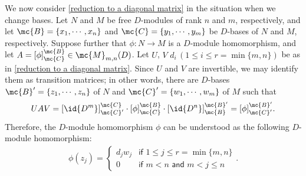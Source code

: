 \begin{obs}\label{over ED: change of bases}
    We now consider \cref{reduction to a diagonal matrix} in the situation when we change bases.
    Let $N$ and $M$ be free $D$-modules of rank $n$ and $m$, respectively, and let $\mc{B}=\{x_1, \cdots, x_n\}$ and $\mc{C}=\{y_1, \cdots, y_m\}$ be $D$-bases of $N$ and $M$, respectively.
    Suppose further that $\phi: N\rightarrow M$ is a $D$-module homomorphism, and let $A=[\phi]^\mc{B}_\mc{C}\in\mc{M}_{m, n}(D)$.
    Let $U$, $V$ $d_i\,(1\leq i\leq r=\min\{m, n\})$ be as in \cref{reduction to a diagonal matrix}.
    Since $U$ and $V$ are invertible, we may identify them as transition matrices; in other words, there are $D$-bases $\mc{B}'=\{z_1, \cdots, z_n\}$ of $N$ and $\mc{C}'=\{w_1, \cdots, w_m\}$ of $M$ such that
    \begin{align*}
        UAV
        = [\id{D^m}]^{\mc{C}}_{\mc{C}'} \cdot [\phi]^{\mc{B}}_\mc{C} \cdot [\id{D^n}]^{\mc{B}'}_{\mc{B}}
        = [\phi]^{\mc{B}'}_{\mc{C}'}.
    \end{align*}
    Therefore, the $D$-module homomorphism $\phi$ can be understood as the following $D$-module homomorphism:
    \begin{eqnarray*}
        \phi(z_j)=
        \left\{\begin{matrix}
            d_jw_j  & \textsf{if }1\leq j\leq r=\min\{m, n\}\\
            0       & \textsf{if }m<n\textsf{ and }m<j\leq n
        \end{matrix}\right..
\end{eqnarray*}
\end{obs}

